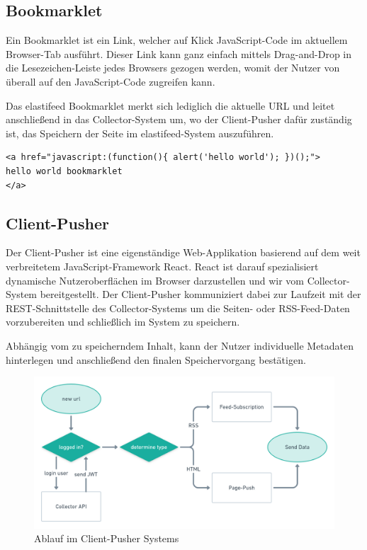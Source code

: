     \subsection{Bookmarklet}
        Ein Bookmarklet ist ein Link, welcher auf Klick JavaScript-Code im aktuellem Browser-Tab ausführt. Dieser Link kann ganz einfach mittels Drag-and-Drop in die Lesezeichen-Leiste jedes Browsers gezogen werden, womit der Nutzer von überall auf den JavaScript-Code zugreifen kann.
        
        Das elastifeed Bookmarklet merkt sich lediglich die aktuelle URL und leitet anschließend in das Collector-System um, wo der Client-Pusher dafür zuständig ist, das Speichern der Seite im elastifeed-System auszuführen.
        
        \begin{lstlisting}[caption=HTML Aufbau eines Bookmarklet]
<a href="javascript:(function(){ alert('hello world'); })();">
hello world bookmarklet
</a>
        \end{lstlisting}

    \subsection{Client-Pusher}
        Der Client-Pusher ist eine eigenständige Web-Applikation basierend auf dem weit verbreitetem JavaScript-Framework React. React ist darauf spezialisiert dynamische Nutzeroberflächen im Browser darzustellen und wir vom Collector-System bereitgestellt. Der Client-Pusher kommuniziert dabei zur Laufzeit mit der REST-Schnittstelle des Collector-Systems um die Seiten- oder RSS-Feed-Daten vorzubereiten und schließlich im System zu speichern.

        Abhängig vom zu speicherndem Inhalt, kann der Nutzer individuelle Metadaten hinterlegen und anschließend den finalen Speichervorgang bestätigen.

        \begin{figure}[h]
        	\centering
            \includegraphics[width=\textwidth]{images/collector-pusher-process.png}
            \caption{Ablauf im Client-Pusher Systems}
        \end{figure}
        
